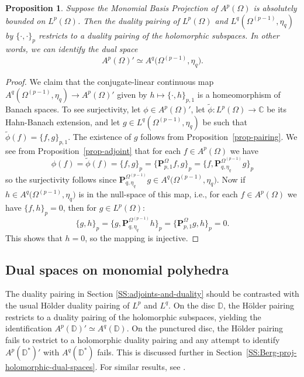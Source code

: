 \documentclass[letterpaper,11pt,reqno]{amsart}
\theoremstyle{plain}
\newtheorem{proposition}[equation]{Proposition}
\theoremstyle{definition}
\theoremstyle{remark}
\theoremstyle{remark}
\numberwithin{equation}{section}
\newcommand{\wt}{\widetilde}
\newcommand{\cx}{{\mathbb C}}
\newcommand{\D}{{\mathbb D}}
\begin{document}
\begin{proposition}\label{prop-dual}
Suppose the Monomial Basis Projection of $A^p(\Omega)$ is absolutely bounded on $L^p(\Omega)$. 
Then the duality pairing of $L^p(\Omega)$ and $L^q(\Omega^{(p-1)}, \eta_q)$ by $\{\cdot,\cdot\}_p$ restricts to a duality pairing of the holomorphic subspaces.
 In other words, we can identify the dual space
\[
A^p(\Omega)' \simeq A^q\big(\Omega^{(p-1)},\eta_q \big).
\]
\end{proposition}
\begin{proof}
We claim that the conjugate-linear continuous map $A^q(\Omega^{(p-1)}, \eta_q )\to A^p(\Omega)'$ given by $h \mapsto \{\cdot, h\}_{p,1}$ is a  homeomorphism of Banach spaces. 
To see surjectivity, let $\phi\in A^p(\Omega)'$, let $\wt{\phi}: L^p(\Omega)\to \cx$ be its Hahn-Banach extension, and let $g\in L^q(\Omega^{(p-1)}, \eta_q)$ be such that $\wt{\phi}(f)=\{f,g\}_{p,1}$. 
The existence of $g$ follows from Proposition~\ref{prop-pairing}. 
We see from Proposition~\ref{prop-adjoint} that for each $f\in A^p(\Omega)$ we have
\[ 
\phi(f)= \wt{\phi}(f)= \{f,g\}_p = \{\bm{P}^{\Omega}_{p,1}f,g\}_p= \{f,\bm{P}^{\Omega^{(p-1)}}_{q,\eta_q}g\}_p
\]
so the surjectivity follows since $\bm{P}^{\Omega^{(p-1)}}_{q,\eta_q}g\in A^q\big(\Omega^{(p-1)}, \eta_q \big)$. 
Now if $h\in A^q\big(\Omega^{(p-1)}, \eta_q \big)$ is in the null-space of this map, i.e., for each $f\in A^p(\Omega)$ we have $\{f,h\}_p=0$, then for $g\in L^p(\Omega)$:
\[
\{g,h\}_p = \{g, \bm{P}^{\Omega^{(p-1)}}_{q,\eta_q}h\}_p=\{\bm{P}^{\Omega}_{p,1}g, h\}_p=0. 
\]
This shows that $h = 0$, so the mapping is injective.
\end{proof}

\subsection{Dual spaces on monomial polyhedra}

The duality pairing in Section \ref{SS:adjoints-and-duality} should be contrasted with the usual Hölder duality pairing of $L^p$ and $L^q$. 
On the disc $\D$, the Hölder pairing restricts to a duality pairing of the holomorphic subspaces, yielding the identification $A^p(\D)' \simeq A^q(\D)$.
On the punctured disc, the Hölder pairing fails to restrict to a holomorphic duality pairing and any attempt to identify $A^p(\D^*)'$ with $A^q(\D^*)$ fails.
This is discussed further in Section~\ref{SS:Berg-proj-holomorphic-dual-spaces}.
For similar results, see \cite{zeljko}.
\end{document}
